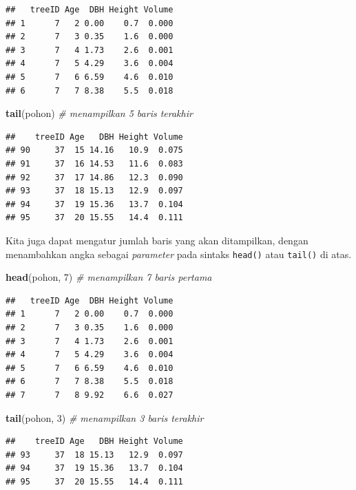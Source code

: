 \documentclass[
  12pt,
  a4paper,
]{scrbook}
\newenvironment{Shaded}{\begin{snugshade}}{\end{snugshade}}
\newcommand{\CommentTok}[1]{\textcolor[rgb]{0.56,0.35,0.01}{\textit{#1}}}
\newcommand{\DecValTok}[1]{\textcolor[rgb]{0.00,0.00,0.81}{#1}}
\newcommand{\KeywordTok}[1]{\textcolor[rgb]{0.13,0.29,0.53}{\textbf{#1}}}
\newcommand{\NormalTok}[1]{#1}
\begin{document}
\begin{verbatim}
##   treeID Age  DBH Height Volume
## 1      7   2 0.00    0.7  0.000
## 2      7   3 0.35    1.6  0.000
## 3      7   4 1.73    2.6  0.001
## 4      7   5 4.29    3.6  0.004
## 5      7   6 6.59    4.6  0.010
## 6      7   7 8.38    5.5  0.018
\end{verbatim}

\begin{Shaded}
\begin{Highlighting}[]
\KeywordTok{tail}\NormalTok{(pohon)  }\CommentTok{# menampilkan 5 baris terakhir}
\end{Highlighting}
\end{Shaded}

\begin{verbatim}
##    treeID Age   DBH Height Volume
## 90     37  15 14.16   10.9  0.075
## 91     37  16 14.53   11.6  0.083
## 92     37  17 14.86   12.3  0.090
## 93     37  18 15.13   12.9  0.097
## 94     37  19 15.36   13.7  0.104
## 95     37  20 15.55   14.4  0.111
\end{verbatim}

Kita juga dapat mengatur jumlah baris yang akan ditampilkan, dengan
menambahkan angka sebagai \emph{parameter} pada sintaks \texttt{head()}
atau \texttt{tail()} di atas.

\begin{Shaded}
\begin{Highlighting}[]
\KeywordTok{head}\NormalTok{(pohon, }\DecValTok{7}\NormalTok{)  }\CommentTok{# menampilkan 7 baris pertama}
\end{Highlighting}
\end{Shaded}

\begin{verbatim}
##   treeID Age  DBH Height Volume
## 1      7   2 0.00    0.7  0.000
## 2      7   3 0.35    1.6  0.000
## 3      7   4 1.73    2.6  0.001
## 4      7   5 4.29    3.6  0.004
## 5      7   6 6.59    4.6  0.010
## 6      7   7 8.38    5.5  0.018
## 7      7   8 9.92    6.6  0.027
\end{verbatim}

\begin{Shaded}
\begin{Highlighting}[]
\KeywordTok{tail}\NormalTok{(pohon, }\DecValTok{3}\NormalTok{)  }\CommentTok{# menampilkan 3 baris terakhir}
\end{Highlighting}
\end{Shaded}

\begin{verbatim}
##    treeID Age   DBH Height Volume
## 93     37  18 15.13   12.9  0.097
## 94     37  19 15.36   13.7  0.104
## 95     37  20 15.55   14.4  0.111
\end{verbatim}
\end{document}
